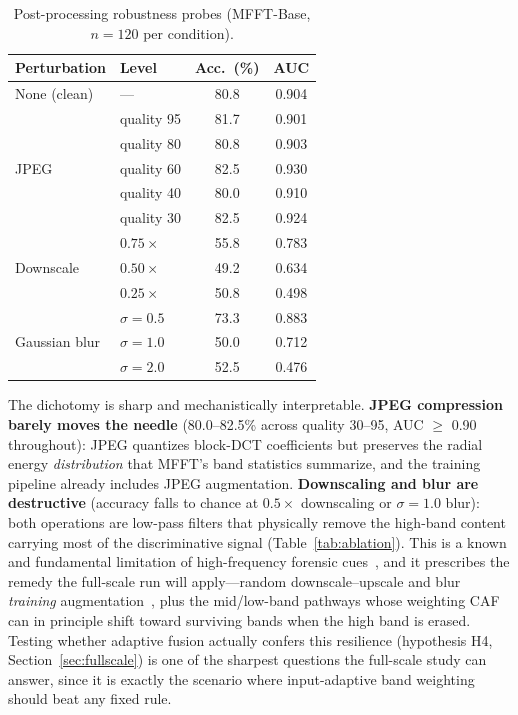 \documentclass[journal]{IEEEtran}
\begin{document}
\begin{table}[!t]
\renewcommand{\arraystretch}{1.2}
\caption{Post-processing robustness probes (MFFT-Base, $n{=}120$ per condition).}
\label{tab:robustness}
\centering
\setlength{\tabcolsep}{4pt}
\begin{tabular}{llcc}
\toprule
Perturbation & Level & Acc.\ (\%) & AUC \\
\midrule
None (clean)  & ---        & 80.8 & 0.904 \\
\midrule
\multirow{5}{*}{JPEG}
 & quality 95 & 81.7 & 0.901 \\
 & quality 80 & 80.8 & 0.903 \\
 & quality 60 & 82.5 & 0.930 \\
 & quality 40 & 80.0 & 0.910 \\
 & quality 30 & 82.5 & 0.924 \\
\midrule
\multirow{3}{*}{Downscale}
 & $0.75\times$ & 55.8 & 0.783 \\
 & $0.50\times$ & 49.2 & 0.634 \\
 & $0.25\times$ & 50.8 & 0.498 \\
\midrule
\multirow{3}{*}{Gaussian blur}
 & $\sigma = 0.5$ & 73.3 & 0.883 \\
 & $\sigma = 1.0$ & 50.0 & 0.712 \\
 & $\sigma = 2.0$ & 52.5 & 0.476 \\
\bottomrule
\end{tabular}
\end{table}

The dichotomy is sharp and mechanistically interpretable. \textbf{JPEG compression barely moves the needle} (80.0--82.5\% across quality 30--95, AUC $\ge$ 0.90 throughout): JPEG quantizes block-DCT coefficients but preserves the radial energy \emph{distribution} that MFFT's band statistics summarize, and the training pipeline already includes JPEG augmentation. \textbf{Downscaling and blur are destructive} (accuracy falls to chance at $0.5\times$ downscaling or $\sigma{=}1.0$ blur): both operations are low-pass filters that physically remove the high-band content carrying most of the discriminative signal (Table~\ref{tab:ablation}). This is a known and fundamental limitation of high-frequency forensic cues~\cite{wang2020,tan2024freqnet}, and it prescribes the remedy the full-scale run will apply---random downscale--upscale and blur \emph{training} augmentation~\cite{wang2020}, plus the mid/low-band pathways whose weighting CAF can in principle shift toward surviving bands when the high band is erased. Testing whether adaptive fusion actually confers this resilience (hypothesis H4, Section~\ref{sec:fullscale}) is one of the sharpest questions the full-scale study can answer, since it is exactly the scenario where input-adaptive band weighting should beat any fixed rule.
\end{document}
